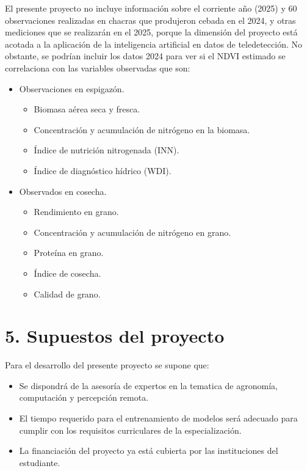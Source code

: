 \documentclass[
11pt, %
]{charter}
\begin{document}
El presente proyecto no incluye información sobre el corriente año (2025) y 60 observaciones realizadas en chacras que produjeron cebada en el 2024, y otras mediciones que se realizarán en el 2025, porque la dimensión del proyecto está acotada a la aplicación de la inteligencia artificial en datos de teledetección. No obstante, se podrían incluir los datos 2024 para ver si el NDVI estimado se correlaciona con las variables observadas que son:
\begin{itemize}
	\item Observaciones en espigazón.
		\begin{itemize}
		\item Biomasa aérea seca y fresca.
		\item Concentración y acumulación de nitrógeno en la biomasa.
		\item Índice de nutrición nitrogenada (INN).
		\item Índice de diagnóstico hídrico (WDI).		
		\end{itemize}
	\item Observados en cosecha.
		\begin{itemize}
		\item Rendimiento en grano.
		\item Concentración y acumulación de nitrógeno en grano.
		\item Proteína en grano.
		\item Índice de cosecha.
		\item Calidad de grano.
		\end{itemize}
	
\end{itemize}



\section{5. Supuestos del proyecto}
\label{sec:supuestos}

Para el desarrollo del presente proyecto se supone que:

\begin{itemize}
	\item Se dispondrá de la asesoría de expertos en la tematica de agronomía, computación y percepción remota.
	\item El tiempo requerido para el entrenamiento de modelos será adecuado para cumplir con los requisitos curriculares de la especialización.
	\item La financiación del proyecto ya está cubierta por las instituciones del estudiante.
\end{itemize}
\end{document}

